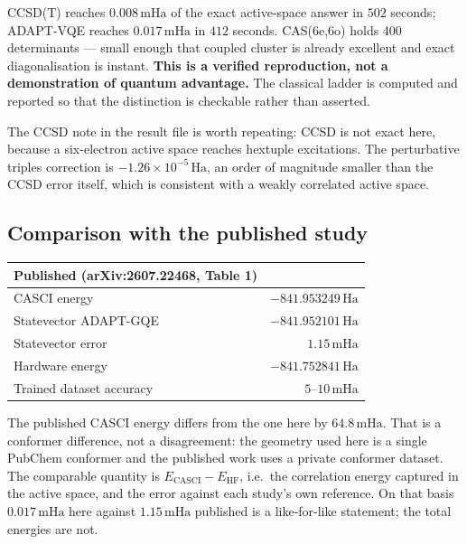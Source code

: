 \documentclass[11pt,a4paper]{article}
\newcommand{\mHa}{\ensuremath{\,\mathrm{mHa}}}
\newcommand{\Ha}{\ensuremath{\,\mathrm{Ha}}}
\begin{document}
\begin{caution}
CCSD(T) reaches $0.008\mHa$ of the exact active-space answer in $502$ seconds;
ADAPT-VQE reaches $0.017\mHa$ in $412$ seconds. CAS(6e,6o) holds 400
determinants --- small enough that coupled cluster is already excellent and
exact diagonalisation is instant. \textbf{This is a verified reproduction, not a
demonstration of quantum advantage.} The classical ladder is computed and
reported so that the distinction is checkable rather than asserted.
\end{caution}

The CCSD note in the result file is worth repeating: CCSD is not exact here,
because a six-electron active space reaches hextuple excitations. The
perturbative triples correction is $-1.26\times10^{-5}\Ha$, an order of
magnitude smaller than the CCSD error itself, which is consistent with a
weakly correlated active space.

\subsection{Comparison with the published study}

\begin{center}
\small
\begin{tabular}{lr}
\toprule
Published (arXiv:2607.22468, Table 1) & \\
\midrule
CASCI energy                & $-841.953249\Ha$ \\
Statevector ADAPT-GQE       & $-841.952101\Ha$ \\
Statevector error           & $1.15\mHa$ \\
Hardware energy             & $-841.752841\Ha$ \\
Trained dataset accuracy    & $5$--$10\mHa$ \\
\bottomrule
\end{tabular}
\end{center}

\begin{caution}
The published CASCI energy differs from the one here by $64.8\mHa$. That is a
conformer difference, not a disagreement: the geometry used here is a single
PubChem conformer and the published work uses a private conformer dataset. The
comparable quantity is $E_{\mathrm{CASCI}} - E_{\mathrm{HF}}$, i.e.\ the
correlation energy captured in the active space, and the error against each
study's own reference. On that basis $0.017\mHa$ here against $1.15\mHa$
published is a like-for-like statement; the total energies are not.
\end{caution}
\end{document}
